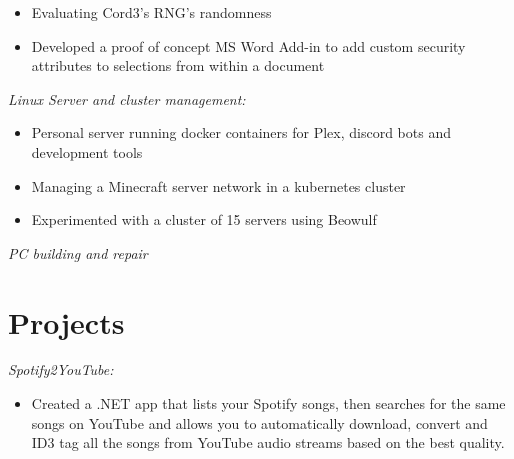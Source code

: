 \documentclass[margin, 10pt]{res} %
\begin{document}
\begin{resume}
\begin{itemize} \itemsep -2pt %
\item Evaluating Cord3's RNG's randomness
\item Developed a proof of concept MS Word Add-in to add custom security attributes to selections from within a document
\end{itemize}

 

{\sl Linux Server and cluster management:}
\begin{itemize} \itemsep -2pt
\item Personal server running docker containers for Plex, discord bots and development tools
\item Managing a Minecraft server network in a kubernetes cluster
\item Experimented with a cluster of 15 servers using Beowulf
\end{itemize}

{\sl PC building and repair}
 


\section{Projects} 
{\sl Spotify2YouTube:}
\begin{itemize}
    \item Created a .NET app that lists your Spotify songs, then searches for the same songs on YouTube and allows you to automatically download, convert and ID3 tag all the songs from YouTube audio streams based on the best quality.
\end{itemize}



\end{resume}
\end{document}
